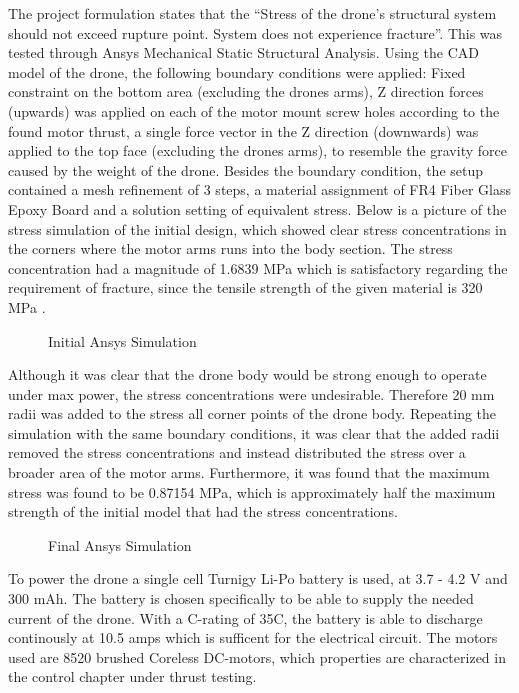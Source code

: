 \documentclass[12pt]{article}
\begin{document}
The project formulation states that the “Stress of the drone’s structural system should not exceed rupture point. System does not experience fracture”. This was tested through Ansys Mechanical Static Structural Analysis. Using the CAD model of the drone, the following boundary conditions were applied: Fixed constraint on the bottom area (excluding the drones arms), Z direction forces (upwards) was applied on each of the motor mount screw holes according to the found motor thrust, a single force vector in the Z direction (downwards) was applied to the top face (excluding the drones arms), to resemble the gravity force caused by the weight of the drone. Besides the boundary condition, the setup contained a mesh refinement of 3 steps, a material assignment of FR4 Fiber Glass Epoxy Board and a solution setting of equivalent stress. Below is a picture of the stress simulation of the initial design, which showed clear stress concentrations in the corners where the motor arms runs into the body section. The stress concentration had a magnitude of 1.6839 MPa which is satisfactory regarding the requirement of fracture, since the tensile strength of the given material is 320 MPa \cite{FR4}. 

\begin{figure}[H]%
    \centering
    \caption{Initial Ansys Simulation}%
    \label{fig:example}%
\end{figure}

Although it was clear that the drone body would be strong enough to operate under max power, the stress concentrations were undesirable. Therefore 20 mm radii was added to the stress all corner points of the drone body. Repeating the simulation with the same boundary conditions, it was clear that the added radii removed the stress concentrations and instead distributed the stress over a broader area of the motor arms. Furthermore, it was found that the maximum stress was found to be 0.87154 MPa, which is approximately half the maximum strength of the initial model that had the stress concentrations.

\begin{figure}[H]%
    \centering
    \caption{Final Ansys Simulation}%
    \label{fig:example}%
\end{figure}

To power the drone a single cell Turnigy Li-Po battery is used, at 3.7 - 4.2 V and 300 mAh. The battery is chosen specifically to be able to supply the needed current of the drone. With a C-rating of 35C, the battery is able to discharge continously at 10.5 amps which is sufficent for the electrical circuit. The motors used are 8520 brushed Coreless DC-motors, which properties are characterized in the control chapter under thrust testing. 
\end{document}
